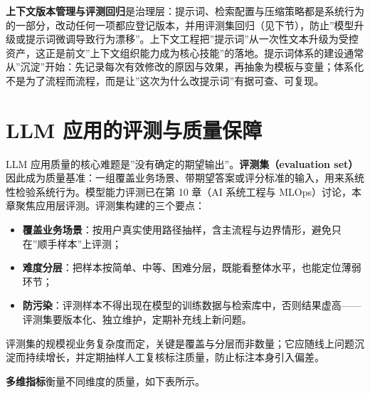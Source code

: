 \documentclass[
]{ctexbook}
\providecommand{\tightlist}{\setlength{\itemsep}{0pt}\setlength{\parskip}{0pt} }
\begin{document}
\textbf{上下文版本管理与评测回归}是治理层：提示词、检索配置与压缩策略都是系统行为的一部分，改动任何一项都应登记版本，并用评测集回归（见下节），防止''模型升级或提示词微调导致行为漂移''。上下文工程把''提示词''从一次性文本升级为受控资产，这正是前文''上下文组织能力成为核心技能''的落地。提示词体系的建设通常从''沉淀''开始：先记录每次有效修改的原因与效果，再抽象为模板与变量；体系化不是为了流程而流程，而是让''这次为什么改提示词''有据可查、可复现。

\section{LLM
应用的评测与质量保障}\label{llm-ux5e94ux7528ux7684ux8bc4ux6d4bux4e0eux8d28ux91cfux4fddux969c}

LLM
应用质量的核心难题是''没有确定的期望输出''。\textbf{评测集（evaluation
set）}因此成为质量基准：一组覆盖业务场景、带期望答案或评分标准的输入，用来系统性检验系统行为。模型能力评测已在第
10 章（AI 系统工程与
MLOps）讨论，本章聚焦应用层评测。评测集构建的三个要点：

\begin{itemize}
\tightlist
\item
  \textbf{覆盖业务场景}：按用户真实使用路径抽样，含主流程与边界情形，避免只在''顺手样本''上评测；
\item
  \textbf{难度分层}：把样本按简单、中等、困难分层，既能看整体水平，也能定位薄弱环节；
\item
  \textbf{防污染}：评测样本不得出现在模型的训练数据与检索库中，否则结果虚高------评测集要版本化、独立维护，定期补充线上新问题。
\end{itemize}

评测集的规模视业务复杂度而定，关键是覆盖与分层而非数量；它应随线上问题沉淀而持续增长，并定期抽样人工复核标注质量，防止标注本身引入偏差。

\textbf{多维指标}衡量不同维度的质量，如下表所示。
\end{document}
